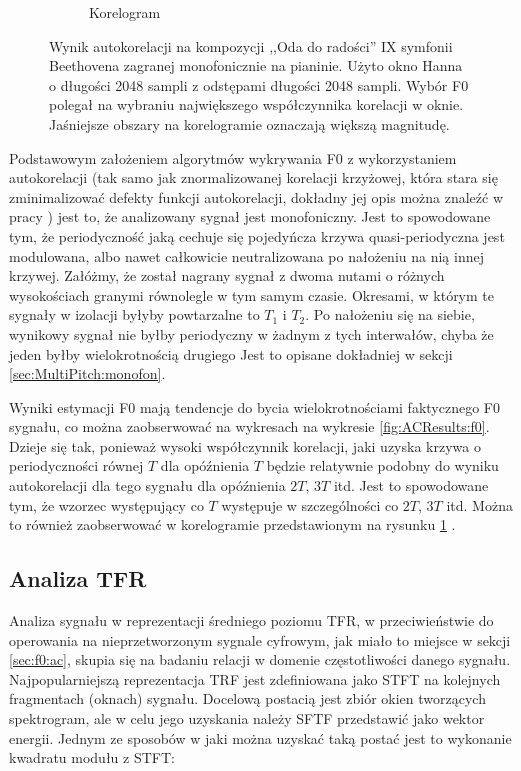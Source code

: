 \documentclass[12pt,a4paper,twoside]{mwart}
\begin{document}
\begin{figure}[t]
\begin{subfigure}{1\textwidth}
    \caption{Korelogram}
    \label{fig:ACResults:corr}
  \end{subfigure}
  \caption{Wynik autokorelacji na kompozycji ,,Oda do radości'' IX symfonii Beethovena zagranej monofonicznie na pianinie. Użyto okno Hanna o długości 2048 sampli z odstępami długości 2048 sampli. Wybór F0 polegał na wybraniu największego współczynnika korelacji w oknie. Jaśniejsze obszary na korelogramie oznaczają większą magnitudę.}
  \label{fig:ACResults}
\end{figure}

Podstawowym założeniem algorytmów wykrywania F0 z wykorzystaniem autokorelacji (tak samo jak znormalizowanej korelacji krzyżowej, która stara się zminimalizować defekty funkcji autokorelacji, dokładny jej opis można znaleźć w pracy \cite{Transcription:Talkin:RAPT}) jest to, że analizowany sygnał jest monofoniczny. Jest to spowodowane tym, że periodyczność jaką cechuje się pojedyńcza krzywa quasi-periodyczna jest modulowana, albo nawet całkowicie neutralizowana po nałożeniu na nią innej krzywej. Załóżmy, że został nagrany sygnał z dwoma nutami o różnych wysokościach granymi równolegle w tym samym czasie. Okresami, w którym te sygnały w izolacji byłyby powtarzalne to $T_1$ i $T_2$. Po nałożeniu się na siebie, wynikowy sygnał nie byłby periodyczny w żadnym z tych interwałów, chyba że jeden byłby wielokrotnością drugiego Jest to opisane dokładniej w sekcji \ref{sec:MultiPitch:monofon}.

Wyniki estymacji F0 mają tendencje do bycia wielokrotnościami faktycznego F0 sygnału, co można zaobserwować na wykresach na wykresie \ref{fig:ACResults:f0}. Dzieje się tak, ponieważ wysoki współczynnik korelacji, jaki uzyska krzywa o periodyczności równej $T$ dla opóźnienia $T$ będzie relatywnie podobny do wyniku autokorelacji dla tego sygnału dla opóźnienia $2T$, $3T$ itd. Jest to spowodowane tym, że wzorzec występujący co $T$ występuje w szczególności co $2T$, $3T$ itd. Można to również zaobserwować w korelogramie przedstawionym na rysunku \ref{fig:ACResults:corr} 
\cite[231-244]{Transcription:Anssi:SignalProcessingMethods}
.

\subsection{Analiza TFR} \label{sec:f0:tfr}
Analiza sygnału w reprezentacji średniego poziomu TFR, w przeciwieństwie do operowania na nieprzetworzonym sygnale cyfrowym, jak miało to miejsce w sekcji \ref{sec:f0:ac}, skupia się na badaniu relacji w domenie częstotliwości danego sygnału. Najpopularniejszą reprezentacja TRF jest zdefiniowana jako STFT na kolejnych fragmentach (oknach) sygnału. Docelową postacią jest zbiór okien tworzących spektrogram, ale w celu jego uzyskania należy SFTF przedstawić jako wektor energii. Jednym ze sposobów w jaki można uzyskać taką postać jest to wykonanie kwadratu modułu z STFT:
\end{document}
